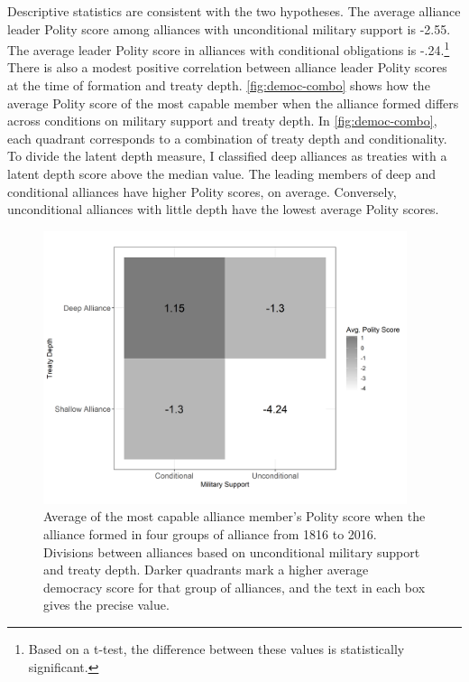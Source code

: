 \documentclass[12pt]{article}
\begin{document}
Descriptive statistics are consistent with the two hypotheses.
The average alliance leader Polity score among alliances with unconditional military support is -2.55. 
The average leader Polity score in alliances with conditional obligations is -.24.\footnote{Based on a t-test, the difference between these values is statistically significant.} 
There is also a modest positive correlation between alliance leader Polity scores at the time of formation and treaty depth. 
\autoref{fig:democ-combo} shows how the average Polity score of the most capable member when the alliance formed differs across conditions on military support and treaty depth.
In \autoref{fig:democ-combo}, each quadrant corresponds to a combination of treaty depth and conditionality. 
To divide the latent depth measure, I classified deep alliances as treaties with a latent depth score above the median value. 
The leading members of deep and conditional alliances have higher Polity scores, on average. 
Conversely, unconditional alliances with little depth have the lowest average Polity scores. 


\begin{figure}[hbtp]
\centering
\includegraphics[width=0.95\textwidth]{../figures/democ-combo.png}
\caption{Average of the most capable alliance member's Polity score when the alliance formed in four groups of alliance from 1816 to 2016. Divisions between alliances based on unconditional military support and treaty depth. Darker quadrants mark a higher average democracy score for that group of alliances, and the text in each box gives the precise value.}
\label{fig:democ-combo}
\end{figure}
\end{document}
